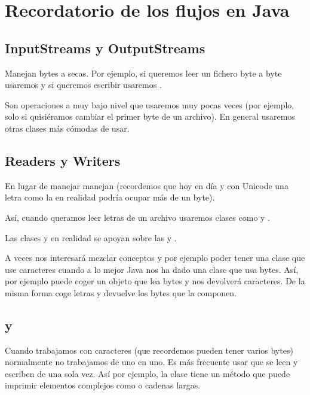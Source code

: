 \documentclass[letterpaper,10pt,spanish]{sphinxmanual}
\begin{document}
\section{Recordatorio de los flujos en Java}
\label{\detokenize{textos/tema3:recordatorio-de-los-flujos-en-java}}

\subsection{InputStreams y OutputStreams}
\label{\detokenize{textos/tema3:inputstreams-y-outputstreams}}
Manejan bytes a secas. Por ejemplo, si queremos leer un fichero byte a byte usaremos  y si queremos escribir usaremos .

Son operaciones a muy bajo nivel que usaremos muy pocas veces (por ejemplo, solo si quisiéramos cambiar el primer byte de un archivo). En general usaremos otras clases más cómodas de usar.


\subsection{Readers y Writers}
\label{\detokenize{textos/tema3:readers-y-writers}}
En lugar de manejar  manejan  (recordemos que hoy en día y con Unicode una letra como la  en realidad podría ocupar más de un byte).

Así, cuando queramos leer letras de un archivo usaremos clases como  y .

Las clases  y  en realidad se apoyan sobre las  y .

A veces nos interesará mezclar conceptos y por ejemplo poder tener una clase que use caracteres cuando a lo mejor Java nos ha dado una clase que usa bytes. Así, por ejemplo  puede coger un objeto que lea bytes y nos devolverá caracteres. De la misma forma  coge letras y devuelve los bytes que la componen.


\subsection{ y }
\label{\detokenize{textos/tema3:bufferedreaders-y-printwriters}}
Cuando trabajamos con caracteres (que recordemos pueden tener varios bytes) normalmente no trabajamos de uno en uno. Es más frecuente usar  que se leen y escriben de una sola vez. Así por ejemplo, la clase  tiene un método  que puede imprimir elementos complejos como  o cadenas largas.
\end{document}
